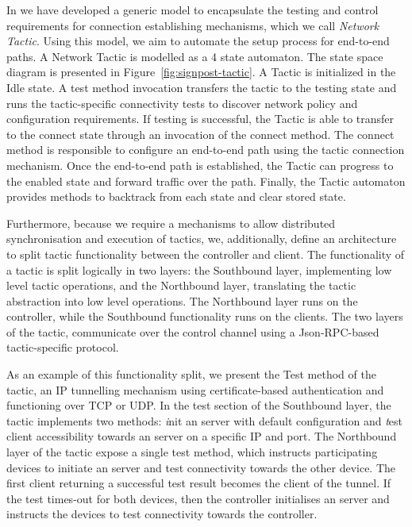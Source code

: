 In \signpost  we have developed a generic model to encapsulate the testing and
control requirements for connection establishing mechanisms, which we call {\it
  Network Tactic}. Using this model, we aim to automate the setup process for
end-to-end paths.  A \signpost Network Tactic is modelled as a 4 state
automaton.  The state space diagram is presented in
Figure~\ref{fig:signpost-tactic}. A Tactic is initialized in the Idle state. A test
method invocation transfers the tactic to the testing state and runs the
tactic-specific connectivity tests to discover network policy and configuration
requirements.  If testing is successful, the Tactic is able to transfer to the
connect state through an invocation of the connect method. The connect method is
responsible to configure an end-to-end path using the tactic connection
mechanism. Once the end-to-end path is established, the Tactic can progress to the
enabled state and forward traffic over the path.  Finally, the Tactic automaton
provides methods to backtrack from each state and clear stored state. 

Furthermore, because we require a mechanisms to allow distributed
synchronisation and execution of tactics, we, additionally, define an
architecture to split tactic functionality between the \signpost controller and
client.  The functionality of a \signpost tactic is split logically in two
layers: the Southbound layer, implementing low level tactic operations, and the
Northbound layer, translating the tactic abstraction into low level operations.
The Northbound layer runs on the \signpost controller, while the
Southbound functionality runs on the \signpost clients.  The two layers of the
tactic, communicate over the control channel using a Json-RPC-based 
tactic-specific protocol. 

As an example of this functionality split, we present the Test method of the
\openvpn tactic, an IP tunnelling mechanism using certificate-based
authentication and functioning over TCP or UDP\@. In the test section of the
Southbound layer, the tactic implements two methods: {\emph init} an \openvpn
server with default configuration and {\emph test} client accessibility towards
an \openvpn server on a specific IP and port. The Northbound layer of the tactic
expose a single test method, which instructs participating devices to initiate
an \openvpn server and test connectivity towards the other device. The first
client returning a successful test result becomes the client of the \openvpn
tunnel. If the test times-out for both devices, then the controller initialises
an \openvpn server and instructs the devices to test \openvpn connectivity
towards the controller.

